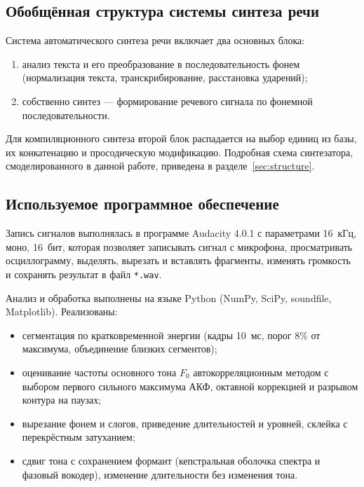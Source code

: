 \subsection{Обобщённая структура системы синтеза речи}

Система автоматического синтеза речи включает два основных блока:
\begin{enumerate}
	\item анализ текста и его преобразование в последовательность фонем
	(нормализация текста, транскрибирование, расстановка ударений);
	\item собственно синтез --- формирование речевого сигнала по фонемной
	последовательности.
\end{enumerate}
Для компиляционного синтеза второй блок распадается на выбор единиц из
базы, их конкатенацию и просодическую модификацию. Подробная схема
синтезатора, смоделированного в данной работе, приведена в
разделе~\ref{sec:structure}.

\subsection{Используемое программное обеспечение}

Запись сигналов выполнялась в программе Audacity 4.0.1 с параметрами
16~кГц, моно, 16~бит, которая позволяет записывать сигнал с микрофона,
просматривать осциллограмму, выделять, вырезать и вставлять фрагменты,
изменять громкость и сохранять результат в файл \texttt{*.wav}.

Анализ и обработка выполнены на языке Python (NumPy, SciPy, soundfile,
Matplotlib). Реализованы:
\begin{itemize}
	\item сегментация по кратковременной энергии (кадры 10~мс, порог 8\%
	от максимума, объединение близких сегментов);
	\item оценивание частоты основного тона $F_0$ автокорреляционным
	методом с выбором первого сильного максимума АКФ, октавной
	коррекцией и разрывом контура на паузах;
	\item вырезание фонем и слогов, приведение длительностей и уровней,
	склейка с перекрёстным затуханием;
	\item сдвиг тона с сохранением формант (кепстральная оболочка спектра
	и фазовый вокодер), изменение длительности без изменения тона.
\end{itemize}
